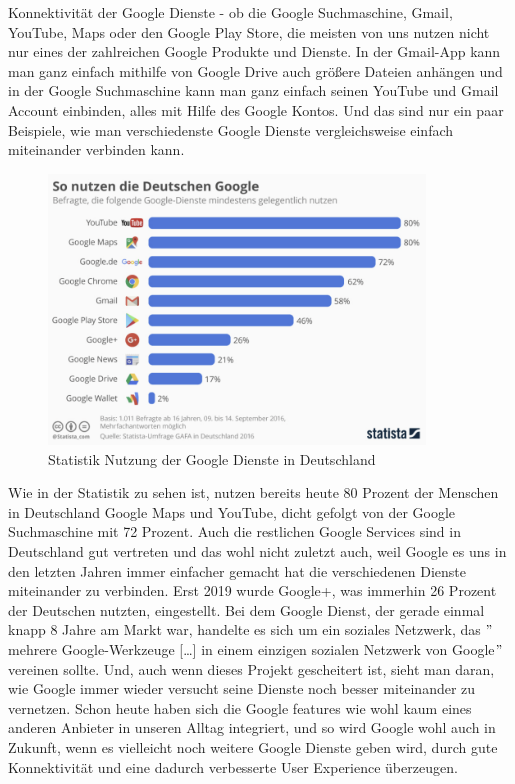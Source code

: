 Konnektivität der Google Dienste - ob die Google Suchmaschine, Gmail, YouTube, Maps oder den Google Play Store,
die meisten von uns nutzen nicht nur eines der zahlreichen Google Produkte und Dienste.
In der Gmail-App kann man ganz einfach mithilfe von Google Drive auch größere Dateien anhängen und in der Google Suchmaschine kann man ganz einfach seinen YouTube und Gmail Account einbinden, alles mit Hilfe des Google Kontos.
Und das sind nur ein paar Beispiele, wie man verschiedenste Google Dienste vergleichsweise einfach miteinander verbinden kann.
\begin{figure}[ht]
    \centering
    \includegraphics[width=100mm]{images/statistic_googleServices}
    \caption{Statistik Nutzung der Google Dienste in Deutschland}
    \label{fig:statisticGoogleServices}
\end{figure}  %
Wie in der Statistik zu sehen ist, nutzen bereits heute 80 Prozent der Menschen in Deutschland Google Maps und YouTube, dicht gefolgt von der Google Suchmaschine mit 72 Prozent.
Auch die restlichen Google Services sind in Deutschland gut vertreten und das wohl nicht zuletzt auch,
weil Google es uns in den letzten Jahren immer einfacher gemacht hat die verschiedenen Dienste miteinander zu verbinden.
Erst 2019 wurde Google+, was immerhin 26 Prozent der Deutschen nutzten, eingestellt.
Bei dem Google Dienst, der gerade einmal knapp 8 Jahre am Markt war, handelte es sich um ein soziales Netzwerk,
das \("\)mehrere Google-Werkzeuge [\ldots] in einem einzigen sozialen Netzwerk von Google\("\)\autocite{JEC21} vereinen sollte.\autocite{JEC21}
Und, auch wenn dieses Projekt gescheitert ist, sieht man daran, wie Google immer wieder versucht seine Dienste noch besser miteinander zu vernetzen.
Schon heute haben sich die Google features wie wohl kaum eines anderen Anbieter in unseren Alltag integriert,
und so wird Google wohl auch in Zukunft, wenn es vielleicht noch weitere Google Dienste geben wird, durch gute Konnektivität und eine dadurch verbesserte User Experience überzeugen.\\

